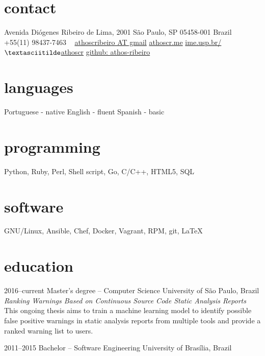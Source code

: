 \documentclass[]{friggeri-cv} %
\begin{document}


\begin{aside} %
\section{contact}
Avenida Diógenes Ribeiro de Lima, 2001
São Paulo, SP 05458-001
Brazil
~
+55(11) 98437-7463
~
\href{mailto:athoscribeiro@gmail.com}{athoscribeiro AT gmail}
\href{http://athoscr.me}{athoscr.me}
\href{https://www.ime.usp.br/~athoscr}{ime.usp.br/$\textasciitilde$athoscr}
\href{https://github.com/athos-ribeiro}{github: athos-ribeiro}
\section{languages}
Portuguese - native
English - fluent
Spanish - basic
\section{programming}
Python, Ruby, Perl, Shell script, Go, C/C++, HTML5, SQL
\section{software}
GNU/Linux, Ansible, Chef, Docker, Vagrant, RPM, git, \LaTeX
\end{aside}


\section{education}

\begin{entrylist}


\entry
{2016--current}
{Master's degree -- {\normalfont Computer Science}}
{University of São Paulo, Brazil}
  {\emph{Ranking Warnings Based on Continuous Source Code Static Analysis Reports} \\ This ongoing thesis aims to train a machine learning model to identify possible false positive warnings in static analysis reports from multiple tools and provide a ranked warning list to users.}


\entry
{2011--2015}
{Bachelor -- {\normalfont Software Engineering}}
{University of Brasília, Brazil}


\end{entrylist}
\end{document}
